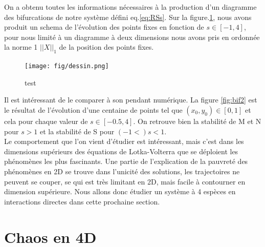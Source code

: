 \documentclass{wsdcr}
\begin{document}
On a obtenu toutes les informations nécessaires à la production d'un diagramme des bifurcations de notre système défini eq.\ref{eq:RSs}. Sur la figure.\ref{fig:dessinlv2}, nous avons produit un schema de l'évolution des points fixes en fonction de $s \in [-1,4]$, pour nous limité à un diagramme à deux dimensions nous avons pris en ordonnée la norme 1 $||X||_1$ de la position des points fixes.
\begin{figure}
    \centering
    \texttt{[image: fig/dessin.png]}
    \caption{test}
    \label{fig:dessinlv2}
\end{figure}
Il est intéressant de le comparer à son pendant numérique. La figure \ref{fig:bif2} est le résultat de l'évolution d'une centaine de points tel que $(x_0,y_0) \in [0,1]$ et cela pour chaque valeur de $s \in [-0.5,4]$. On retrouve bien la stabilité de M et N pour $s > 1$ et la stabilité de S pour $(-1<)s<1$. \\
Le comportement que l'on vient d'étudier est intéressant, mais c'est dans les dimensions supérieurs des équations de Lotka-Volterra que se déploient les phénomènes les plus fascinants. Une partie de l'explication de la pauvreté des phénomènes en 2D se trouve dans l'unicité des solutions, les trajectoires ne peuvent se couper, se qui est très limitant en 2D, mais facile à contourner en dimension supérieure. Nous allons donc étudier un système à 4 espèces en interactions directes dans cette prochaine section.
\section{Chaos en 4D}
\end{document}
